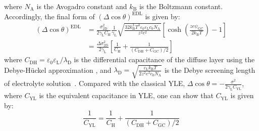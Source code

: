 where \(N_{\mathrm{A}}\) is the Avogadro constant and \(k_{\mathrm{B}}\)
is the Boltzmann constant. Accordingly, the final form
of \((\Delta \cos \theta)^{\mathrm{EDL}}\) is given by:
\begin{equation}
\label{eqn:wet-Delta-cos-EDL-final}
\begin{aligned}
(\Delta \cos \theta)^{\mathrm{EDL}} &= \frac{\sigma_{\mathrm{2D}}^{2}}{2\gamma_{\mathrm{L}}
                                       C_{\mathrm{H}}}\frac{1}{\gamma_{\mathrm{L}}}
                                       \sqrt{\frac{32k_{\mathrm{B}}^{3}T^{3} \varepsilon_{0}\varepsilon_{\mathrm{L}} c_{0} 
                                       N_{\mathrm{A}}}{z^{2}e^{2}}} 
                                       \left[\cosh(\frac{z e \psi_{\mathrm{GC}}}{2k_{\mathrm{B}} T}) -1 \right]\\
                                    &= \frac{\Delta \sigma_{\mathrm{2D}}^{2}}{2\gamma_{\mathrm{L}}}
                                       \left[ \frac{1}{C_{\mathrm{H}}} + \frac{1}{(C_{\mathrm{DH}} + 
                                       C_{\mathrm{GC}})/2}\right]
\end{aligned}
\end{equation}
where
\(C_{\mathrm{DH}}=\varepsilon_{0}\varepsilon_{\mathrm{L}}/\lambda_{\mathrm{D}}\)
is the differential capacitance of the diffuse layer using the
Debye-Hückel approximation \cite{Bard_1980_electrochem_book}, and
\(\lambda_{\mathrm{D}}=\sqrt{\frac{\varepsilon_{\mathrm{L}}k_{\mathrm{B}}T}{2z^{2}e^{2}c_{0}N_{\mathrm{A}}}}\)
is the Debye screening length of electrolyte
solution~\cite{Conway_1951_dielectric_Helmholtz}. Compared with the
classical YLE,
\(\Delta \cos \theta =
-\frac{\sigma^{2}}{2\gamma_{\mathrm{L}}C_{\mathrm{YL}}}\), where
\(C_{\mathrm{YL}}\) is the equivalent capacitance in YLE, one can show
that \(C_{\mathrm{YL}}\) is given by:
\begin{equation}
\label{eqn:wet-CYL-model}
\frac{1}{C_{\mathrm{YL}}} = \frac{1}{C_{\mathrm{H}}} + \frac{1}{(C_{\mathrm{DH}} + C_{\mathrm{GC}})/2}
\end{equation}


